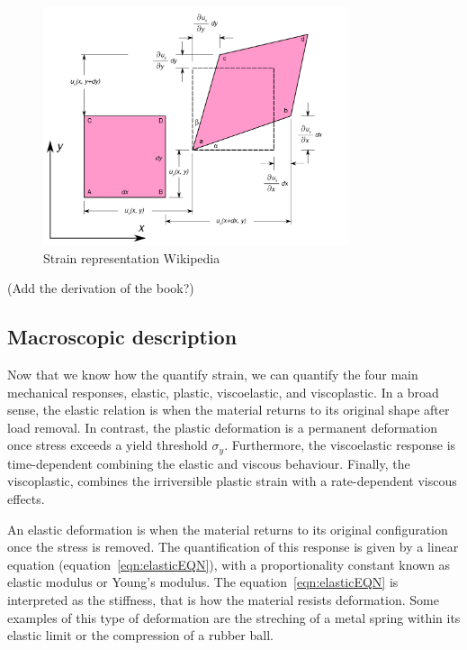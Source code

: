 \begin{figure}[ht!]
    \centering
    \includegraphics[width=0.8\textwidth]{figs/2D_geometric_strain.png}
    \caption{Strain representation Wikipedia}
\end{figure}

(Add the derivation of the book?)

\subsection{Macroscopic description}

Now that we know how the quantify strain, we can quantify the four main mechanical responses,
    elastic,
    plastic,
    viscoelastic,
    and viscoplastic.
In a broad sense, the elastic relation is when the material returns to its original shape after load removal.
In contrast, the plastic deformation is a permanent deformation once stress exceeds a yield threshold $\sigma_y$.
Furthermore, the viscoelastic response is time-dependent combining the elastic and viscous behaviour.
Finally, the viscoplastic, combines the irriversible plastic strain with a rate-dependent viscous effects.

An elastic deformation is when the material returns to its original configuration once the stress is removed.
The quantification of this response is given by a linear equation (equation~\eqref{eqn:elasticEQN}),
with a proportionality constant known as elastic modulus or Young's modulus.
The equation~\eqref{eqn:elasticEQN} is interpreted as the stiffness, that is how the material resists deformation.
Some examples of this type of deformation are the streching of a metal spring within its elastic limit or the compression of a rubber ball.

